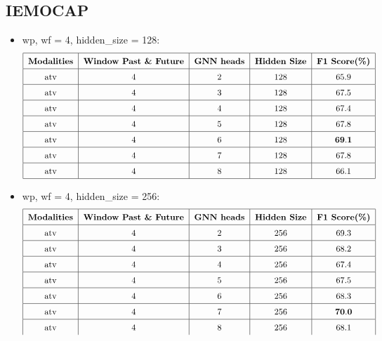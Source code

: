 \documentclass[a4paper]{article}
\begin{document}
\subsection{IEMOCAP}
\begin{itemize}
    \item wp, wf = 4, hidden\_size = 128:
        \[
        \renewcommand{\arraystretch}{1.5}
        \begin{tabular}{|c|c|c|c|c|}
            \hline
            \textbf{Modalities} & \textbf{Window Past \& Future} & \textbf{GNN heads} & \textbf{Hidden Size} & \textbf{F1 Score(\%)} \\
            \hline
            \text{atv} & 4 & 2 & 128 & 65.9 \\
            \hline
            \text{atv} & 4 & 3 & 128 & 67.5 \\
            \hline
            \text{atv} & 4 & 4 & 128 & 67.4 \\
            \hline
            \text{atv} & 4 & 5 & 128 & 67.8 \\
            \hline
            \text{atv} & 4 & 6 & 128 & \(\mathbf{69.1}\) \\
            \hline
            \text{atv} & 4 & 7 & 128 & 67.8 \\
            \hline
            \text{atv} & 4 & 8 & 128 & 66.1 \\
            \hline
        \end{tabular}    
        \]
    \item wp, wf = 4, hidden\_size = 256:
        \[
        \renewcommand{\arraystretch}{1.5}
        \begin{tabular}{|c|c|c|c|c|}
            \hline
            \textbf{Modalities} & \textbf{Window Past \& Future} & \textbf{GNN heads} & \textbf{Hidden Size} & \textbf{F1 Score(\%)} \\
            \hline
            \text{atv} & 4 & 2 & 256 & 69.3 \\
            \hline
            \text{atv} & 4 & 3 & 256 & 68.2 \\
            \hline
            \text{atv} & 4 & 4 & 256 & 67.4 \\
            \hline
            \text{atv} & 4 & 5 & 256 & 67.5 \\
            \hline
            \text{atv} & 4 & 6 & 256 & 68.3 \\
            \hline
            \text{atv} & 4 & 7 & 256 & \(\mathbf{70.0}\) \\
            \hline
            \text{atv} & 4 & 8 & 256 & 68.1 \\

\end{tabular}\]
\end{itemize}
\end{document}
